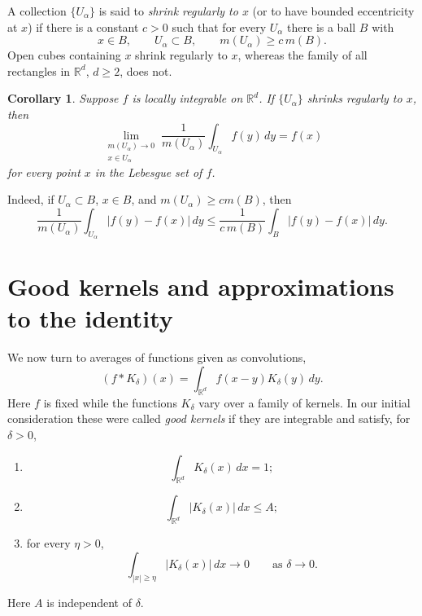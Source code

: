 \documentclass[11pt,openany]{book}
\newtheorem{corollary}[theorem]{Corollary}
\begin{document}
A collection $\{U_\alpha\}$ is said to \emph{shrink regularly to $x$} (or to have bounded eccentricity at $x$) if there is a constant $c>0$ such that for every $U_\alpha$ there is a ball $B$ with
\[
x\in B,\qquad U_\alpha\subset B,\qquad m(U_\alpha)\ge c\,m(B).
\]
Open cubes containing $x$ shrink regularly to $x$, whereas the family of all rectangles in $\mathbb R^d$, $d\ge2$, does not.

\begin{corollary}
Suppose $f$ is locally integrable on $\mathbb R^d$. If $\{U_\alpha\}$ shrinks regularly to $x$, then
\[
\lim_{\substack{m(U_\alpha)\to0\\x\in U_\alpha}}
\frac1{m(U_\alpha)}\int_{U_\alpha}f(y)\,dy=f(x)
\]
for every point $x$ in the Lebesgue set of $f$.
\end{corollary}

Indeed, if $U_\alpha\subset B$, $x\in B$, and $m(U_\alpha)\ge c m(B)$, then
\[
\frac1{m(U_\alpha)}\int_{U_\alpha}|f(y)-f(x)|\,dy
\le \frac1{c\,m(B)}\int_B|f(y)-f(x)|\,dy.
\]

\section{Good kernels and approximations to the identity}

We now turn to averages of functions given as convolutions,
\[
(f*K_\delta)(x)=\int_{\mathbb R^d}f(x-y)K_\delta(y)\,dy.
\]
Here $f$ is fixed while the functions $K_\delta$ vary over a family of kernels. In our initial consideration these were called \emph{good kernels} if they are integrable and satisfy, for $\delta>0$,
\begin{enumerate}
\item[(i)]
\[
\int_{\mathbb R^d}K_\delta(x)\,dx=1;
\]
\item[(ii)]
\[
\int_{\mathbb R^d}|K_\delta(x)|\,dx\le A;
\]
\item[(iii)] for every $\eta>0$,
\[
\int_{|x|\ge\eta}|K_\delta(x)|\,dx\longrightarrow0
\qquad\text{as }\delta\to0.
\]
\end{enumerate}
Here $A$ is independent of $\delta$.
\end{document}
